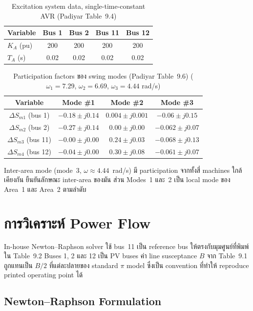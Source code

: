 \documentclass[12pt,a4paper]{article}
\begin{document}
\begin{table}[H]\centering
\caption{Excitation system data, single-time-constant AVR (Padiyar Table~9.4)}
\begin{tabular}{lcccc}\toprule
Variable & Bus 1 & Bus 2 & Bus 11 & Bus 12\\\midrule
$K_A$ (pu)  & 200  & 200  & 200  & 200\\
$T_A$ (s)   & 0.02 & 0.02 & 0.02 & 0.02\\\bottomrule
\end{tabular}\end{table}


\begin{table}[H]\centering\scriptsize
\caption{Participation factors ของ swing modes (Padiyar Table~9.6) ($\omega_1=7.29$, $\omega_2=6.69$, $\omega_3=4.44$ rad/s)}
\begin{tabular}{cccc}\toprule
Variable & Mode \#1 & Mode \#2 & Mode \#3\\\midrule
$\Delta S_{m1}$ (bus 1)  & $-0.18 \pm j0.14$  & $0.004 \pm j0.001$ & $-0.06 \pm j0.15$\\
$\Delta S_{m2}$ (bus 2)  & $-0.27 \pm j0.14$  & $0.00 \pm j0.00$   & $-0.062 \pm j0.07$\\
$\Delta S_{m3}$ (bus 11) & $-0.00 \pm j0.00$  & $0.24 \pm j0.03$   & $-0.068 \pm j0.13$\\
$\Delta S_{m4}$ (bus 12) & $-0.04 \pm j0.00$  & $0.30 \pm j0.08$   & $-0.061 \pm j0.07$\\\bottomrule
\end{tabular}\end{table}

Inter-area mode (mode~3, $\omega\approx4.44$~rad/s) มี participation จากทั้งสี่ machines ใกล้เคียงกัน ยืนยันลักษณะ inter-area ของมัน ส่วน Modes~1 และ~2 เป็น local mode ของ Area~1 และ Area~2 ตามลำดับ


\section{การวิเคราะห์ Power Flow}

In-house Newton--Raphson solver ใช้ bus~11 เป็น reference bus ให้ตรงกับมุมศูนย์ที่พิมพ์ใน Table~9.2 Buses 1, 2 และ 12 เป็น PV buses ค่า line susceptance $B$ จาก Table~9.1 ถูกแทนเป็น $B/2$ ที่แต่ละปลายของ standard $\pi$ model ซึ่งเป็น convention ที่ทำให้ reproduce printed operating point ได้

\subsection{Newton--Raphson Formulation}
\end{document}
